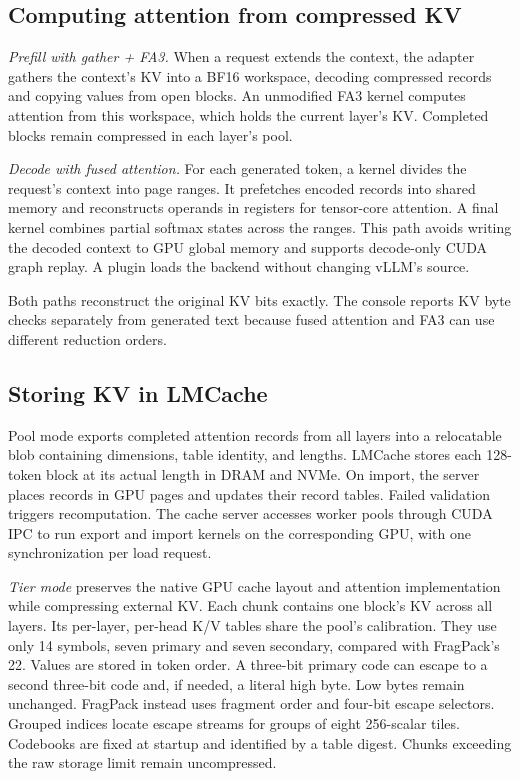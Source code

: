 \documentclass[conference]{IEEEtran}
\begin{document}
\begin{samepage}
\subsection{Computing attention from compressed KV}
\emph{Prefill with gather + FA3.} When a request extends the context, the
adapter gathers the context's KV into a BF16 workspace, decoding compressed
records and copying values from open blocks. An unmodified FA3 kernel
computes attention from this workspace, which holds the current layer's KV.
Completed blocks remain compressed in each layer's pool.

\end{samepage}

\emph{Decode with fused attention.} For each generated token, a kernel divides
the request's context into page ranges. It prefetches encoded records into
shared memory and reconstructs operands in registers for tensor-core
attention. A final kernel combines partial softmax states across the
ranges. This path avoids writing the decoded context to GPU global memory
and supports decode-only CUDA graph replay. A plugin loads the backend
without changing vLLM's source.

Both paths reconstruct the original KV bits exactly. The console reports
KV byte checks separately from generated text because fused attention and
FA3 can use different reduction orders.

\subsection{Storing KV in LMCache}
Pool mode exports completed attention records from all layers into a
relocatable blob containing dimensions, table identity, and lengths.
LMCache stores each 128-token block at its actual length in DRAM and NVMe.
On import, the server places records in GPU pages and updates their record
tables. Failed validation triggers recomputation. The cache server accesses worker
pools through CUDA IPC to run export and import kernels on the corresponding
GPU, with one synchronization per load request.

\emph{Tier mode} preserves the native GPU cache layout and attention
implementation while compressing external KV. Each chunk contains one
block's KV across all layers. Its per-layer, per-head K/V tables share the
pool's calibration. They use only 14 symbols, seven primary and seven
secondary, compared with FragPack's 22. Values are stored in token order. A
three-bit primary code can escape to a second three-bit code and, if
needed, a literal high byte.
Low bytes remain unchanged. FragPack instead uses fragment order and
four-bit escape selectors.
Grouped indices locate escape streams for groups of eight 256-scalar
tiles. Codebooks are fixed at startup and identified by a table digest.
Chunks exceeding the raw
storage limit remain uncompressed.
\end{document}
